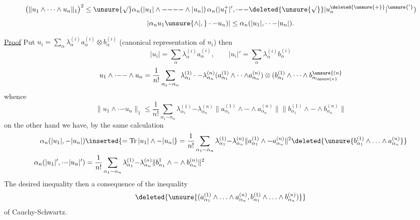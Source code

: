\[
\bigl(\|u_1\wedge\cdots\wedge u_n\|_1\bigr)^2\leq
\unsure{\surd}\alpha_n(|u_1|\wedge\mathord{-}\mathord{-}\mathord{-}\mathord{-}\wedge|u_n|)
\,\alpha_n(|u_1^+|',\cdot\mathord{-}\mathord{-}
\deleted{\unsure{\sqrt{\vphantom{u}}}}|u_n^{\deleted{\unsure{+}}}|^{\unsure{'}})
\]
\[
|\alpha_n u_1\unsure{\wedge|,}\cdot\mathord{-}u_n)|
\leq\alpha_n(|u_1|,\cdot\cdot\mathord{-}|u_n|).
\]
\begin{flushright}
\end{flushright}

\uline{Proof} \quad Put $u_i=\sum_\alpha\lambda_\alpha^{(i)}a_\alpha^{(i)}\otimes b_\alpha^{(i)}$
(canonical representation of $u_i$) then
\[
|u_i|=\sum_\alpha\lambda_\alpha^{(i)}a_\alpha^{(i)},\qquad
|u_i|'=\sum_\alpha\lambda_\alpha^{(i)}b_\alpha^{(i)}
\]
\[
u_1\wedge\cdot\mathord{-}\mathord{-}\wedge u_n
=\frac{1}{n!}\sum_{\alpha_1\mathord{-}\alpha_n}
\lambda_{\alpha_1}^{(1)}\cdot\mathord{-}\lambda_{\alpha_n}^{(n)}
(a_{\alpha_1}^{(1)}\wedge\cdot\cdot\wedge a_{\alpha_n}^{(n)})
\otimes(b_{\alpha_1}^{(1)}\wedge\cdots\wedge b_{\alpha_{\unsure{n}}}^{\unsure{(n}}
\]
whence
\[
\|u_1\wedge\cdot\mathord{-}u_n\|_1\leq\frac{1}{n!}\sum_{\alpha_1\mathord{-}\alpha_n}
\lambda_{\alpha_1}^{(1)}\mathord{-}\lambda_{\alpha_n}^{(n)}
\|a_{\alpha_1}^{(1)}\wedge\mathord{-}\wedge a_{\alpha_n}^{(n)}\|
\|b_{\alpha_1}^{(1)}\wedge\mathord{-}\wedge b_{\alpha_n}^{(n)}\|
\]
on the other hand we have, by the same calculation
\[
\begin{aligned}
\alpha_n(|u_1|,\mathord{-}|u_n|)&\inserted{=\operatorname{Tr}|u_1|\wedge\mathord{-}|u_n|}=
\frac{1}{n!}\sum_{\alpha_1\mathord{-}\alpha_n}\lambda_{\alpha_1}^{(1)}\mathord{-}\lambda_{\alpha_n}^{(n)}
\|a_{\alpha_1}^{(1)}\wedge\mathord{-}a_{\alpha_n}^{(n)}\|^2
\deleted{\unsure{b_{\alpha_1}^{(1)}\wedge\ldots\wedge a_{\alpha_n}^{(n)}}}\\
\alpha_n(|u_1|',\cdot\mathord{-}|u_n|')&=\frac{1}{n!}\sum_{\alpha_1\mathord{-}\alpha_n}
\lambda_{\alpha_1}^{(1)}\mathord{-}\lambda_{\alpha_n}^{(n)}
\|b_{\alpha_1}^{1}\wedge\mathord{-}\wedge b_{\alpha_n}^{(n)}\|^2
\end{aligned}
\]
The desired inequality   then a consequence of the inequality
\[
\deleted{\unsure{(a_{\alpha_1}^{(1)}\wedge\ldots\wedge a_{\alpha_n}^{(n)},b_{\alpha_1}^{(1)}\wedge\ldots\wedge b_{\alpha_n}^{(n)})}}
\]
of Cauchy-Schwartz.

